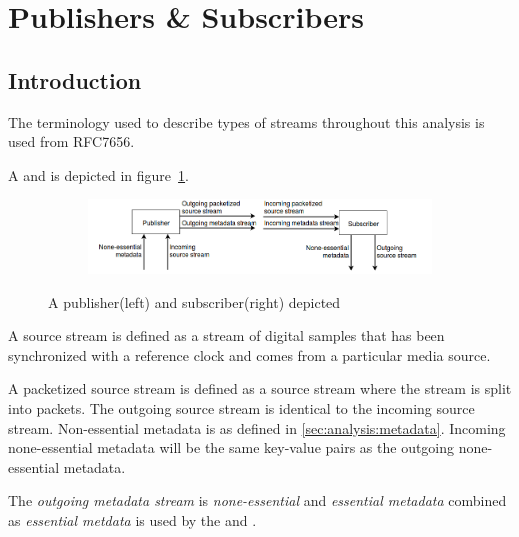 \section{Publishers \& Subscribers} \label{sec:analysis:pubsub}
\subsection{Introduction}
The terminology used to describe types of streams throughout this analysis is used from RFC7656\citep{RFC:7656}.

A  and  is depicted in figure~\ref{fig:analysis:pubsub}.

\begin{figure}[h!]
    \centering
    \begin{subfigure}[b]{1\textwidth}
        \includegraphics[width=\textwidth]{figures/publisher-subscriber}
    \end{subfigure}
     \caption{A publisher(left) and subscriber(right) depicted}\label{fig:analysis:pubsub}
\end{figure}

A source stream is defined as a stream of digital samples that has been synchronized with a reference clock and comes from a particular media source.

A packetized source stream is defined as a source stream where the stream is split into packets.
The outgoing source stream is identical to the incoming source stream.
Non-essential metadata is as defined in \ref{sec:analysis:metadata}. Incoming none-essential metadata will be the same key-value pairs as the outgoing none-essential metadata.

The \textit{outgoing metadata stream} is \textit{none-essential} and \textit{essential metadata} combined as \textit{essential metdata} is used by the  and .

